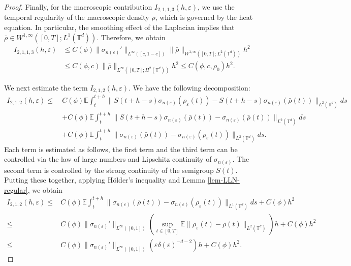 \documentclass[10pt,a4paper]{amsart}
\def\leq{\leqslant}
\begin{document}
\begin{proof}
Finally, for the macroscopic contribution $I_{2,1,1,3}(h,\varepsilon)$, we use the temporal regularity of the macroscopic density $\bar{\rho}$, which is governed by the heat equation. In particular, the smoothing effect of the Laplacian implies that $\bar{\rho} \in W^{1,\infty}([0,T]; L^1(\mathbb{T}^d))$. Therefore, we obtain
\begin{align*}
I_{2,1,1,3}(h,\varepsilon) 
&\leq C(\phi) \| \sigma_{n(\varepsilon)}' \|_{L^{\infty}([c,1-c])} 
\| \bar{\rho} \|_{W^{1,\infty}([0,T]; L^2(\mathbb{T}^d))} h^2 \\
&\leq C(\phi, c) \| \bar{\rho} \|_{L^{\infty}([0,T]; H^2(\mathbb{T}^d))} h^2 
\leq C(\phi, c, \rho_0) h^2.
\end{align*}




We next estimate the term $I_{2,1,2}(h,\varepsilon)$. We have the following decomposition: 
\begin{align*}
I_{2,1,2}(h,\varepsilon)
\leq\ & C(\phi) \mathbb{E} \int_t^{t+h} \| S(t+h-s)\sigma_{n(\varepsilon)}(\rho_{\varepsilon}(t)) - S(t+h-s)\sigma_{n(\varepsilon)}(\bar{\rho}(t)) \|_{L^2(\mathbb{T}^d)} ds \\
&+ C(\phi) \mathbb{E} \int_t^{t+h} \| S(t+h-s)\sigma_{n(\varepsilon)}(\bar{\rho}(t)) - \sigma_{n(\varepsilon)}(\bar{\rho}(t)) \|_{L^2(\mathbb{T}^d)} ds\\
&+C(\phi)\mathbb{E}\int^{t+h}_t\|\sigma_{n(\varepsilon)}(\bar{\rho}(t))-\sigma_{n(\varepsilon)}(\rho_{\varepsilon}(t))\|_{L^2(\mathbb{T}^d)}ds. 
\end{align*}
Each term is estimated as follows, the first term and the third term can be controlled via the law of large numbers and Lipschitz continuity of $ \sigma_{n(\varepsilon)} $. The second term is controlled by the strong continuity of the semigroup $ S(t) $. Putting these together, applying H\"older's inequality and Lemma \ref{lem-LLN-regular}, we obtain
\begin{align*}
I_{2,1,2}(h,\varepsilon)\leq&C(\phi)\mathbb{E}\int^{t+h}_t\| \sigma_{n(\varepsilon)}(\bar{\rho}(t)) - \sigma_{n(\varepsilon)}(\rho_{\varepsilon}(t)) \|_{L^1(\mathbb{T}^d)} ds+C(\phi) h^2\\
\leq&C(\phi) \|\sigma_{n(\varepsilon)}'\|_{L^{\infty}([0,1])}(\sup_{t\in[0,T]}\mathbb{E}\|\rho_{\varepsilon}(t)-\bar{\rho}(t)\|_{L^2(\mathbb{T}^d)})h+C(\phi) h^2\\
\leq& C(\phi) \|\sigma_{n(\varepsilon)}'\|_{L^{\infty}([0,1])} 
\left( \varepsilon \delta(\varepsilon)^{-d-2} \right) h 
+ C(\phi) h^2.
\end{align*}


\end{proof}
\end{document}
